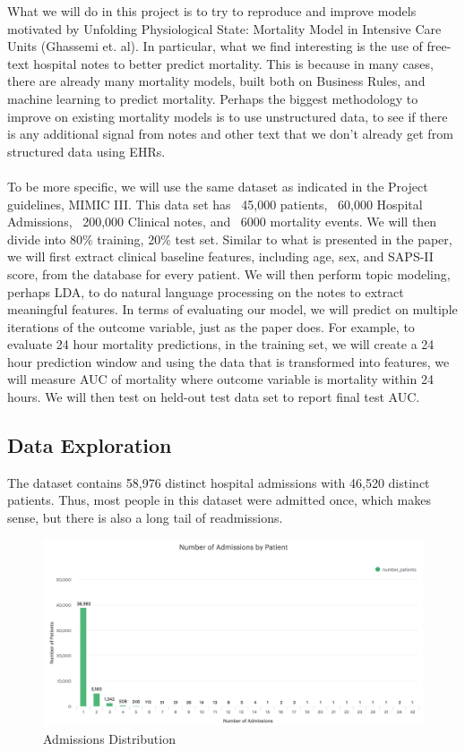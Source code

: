 \documentclass[12pt, final]{article}
\begin{document}
What we will do in this project is to try to reproduce and improve models motivated by Unfolding Physiological State: Mortality Model in Intensive Care Units (Ghassemi et. al). In particular, what we find interesting is the use of free-text hospital notes to better predict mortality. This is because in many cases, there are already many mortality models, built both on Business Rules, and machine learning to predict mortality. Perhaps the biggest methodology to improve on existing mortality models is to use unstructured data, to see if there is any additional signal from notes and other text that we don't already get from structured data using EHRs.
\\
\\
To be more specific, we will use the same dataset as indicated in the Project guidelines, MIMIC III. This data set has ~45,000 patients, ~60,000 Hospital Admissions, ~200,000 Clinical notes, and ~6000 mortality events. We will then divide into 80\% training, 20\% test set. Similar to what is presented in the paper, we will first extract clinical baseline features, including age, sex, and SAPS-II score, from the database for every patient. We will then perform topic modeling, perhaps LDA, to do natural language processing on the notes to extract meaningful features. In terms of evaluating our model, we will predict on multiple iterations of the outcome variable, just as the paper does. For example, to evaluate 24 hour mortality predictions, in the training set, we will create a 24 hour prediction window and using the data that is transformed into features, we will measure AUC of mortality where outcome variable is mortality within 24 hours. We will then test on held-out test data set to report final test AUC.

\subsection{Data Exploration}
\label{Data Exploration}
The dataset contains 58,976 distinct hospital admissions with 46,520 distinct patients. Thus, most people in this dataset were admitted once, which makes sense, but there is also a long tail of readmissions.

\begin{figure}[H]
\centering
\caption{Admissions Distribution}
\label{AdmissionsDistribution}
\includegraphics[page = {1}, scale = 0.4]{./images/admissions-distribution.png}
\end{figure}
\end{document}
